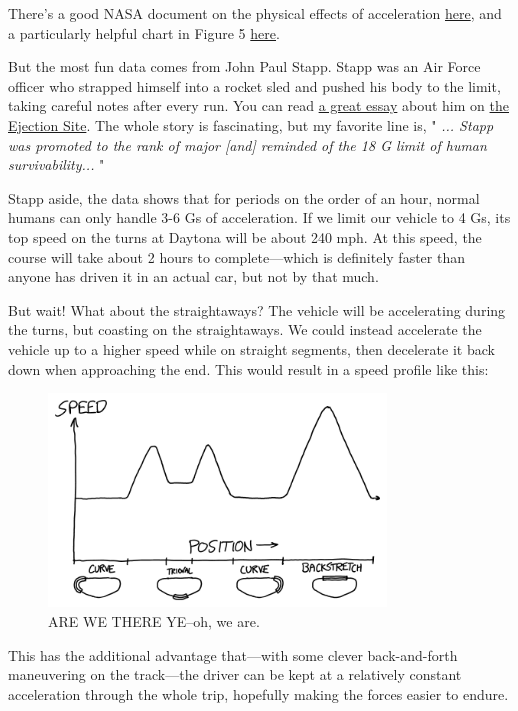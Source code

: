 {{There's a good NASA document on the physical effects of acceleration \href{http://ntrs.nasa.gov/archive/nasa/casi.ntrs.nasa.gov/19930020462.pdf}{here}, and a particularly helpful chart in Figure 5 \href{http://history.nasa.gov/conghand/mannedev.htm} {here}.}

{But the most fun data comes from John Paul Stapp. Stapp was an Air Force officer who strapped himself into a rocket sled and pushed his body to the limit, taking careful notes after every run. You can read \href{http://www.ejectionsite.com/stapp.htm}{a great essay} about him on \href{http://www.ejectionsite.com/} {the Ejection Site}. The whole story is fascinating, but my favorite line is, " \emph{... Stapp was promoted to the rank of major [and] reminded of the 18 G limit of human survivability...} "}

{Stapp aside, the data shows that for periods on the order of an hour, normal humans can only handle 3-6 Gs of acceleration. If we limit our vehicle to 4 Gs, its top speed on the turns at Daytona will be about 240 mph. At this speed, the course will take about 2 hours to complete—which is definitely faster than anyone has driven it in an actual car, but not by that much.}

{But wait! What about the straightaways? The vehicle will be accelerating during the turns, but coasting on the straightaways. We could instead accelerate the vehicle up to a higher speed while on straight segments, then decelerate it back down when approaching the end. This would result in a speed profile like this:}

\begin{figure}[!htbp]
\centering
\includegraphics[scale=0.5, max width=0.8\textwidth]{imgs/a/116/profile.png}
\caption{ARE WE THERE YE--oh, we are.}
\end{figure}

{This has the additional advantage that—with some clever back-and-forth maneuvering on the track—the driver can be kept at a relatively constant acceleration through the whole trip, hopefully making the forces easier to endure.}

}
